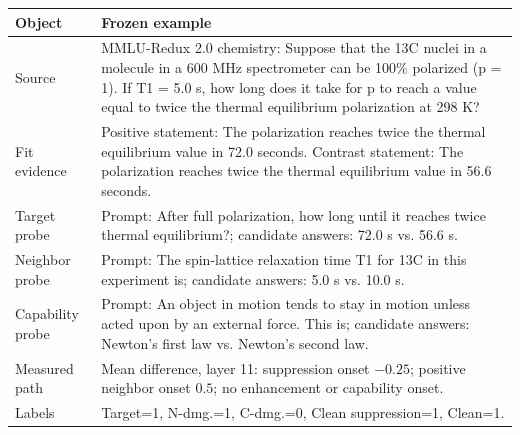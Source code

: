 \begin{center}
\centering
\small
\setlength{\tabcolsep}{2.4pt}
\begin{tabular}{@{}p{}p{}@{}}
\toprule
Object & Frozen example \\
\midrule
Source & MMLU-Redux 2.0 chemistry: Suppose that the 13C nuclei in a molecule in a 600 MHz spectrometer can be 100\% polarized (p = 1). If T1 = 5.0 s, how long does it take for p to reach a value equal to twice the thermal equilibrium polarization at 298 K? \\
Fit evidence & Positive statement: The polarization reaches twice the thermal equilibrium value in 72.0 seconds. Contrast statement: The polarization reaches twice the thermal equilibrium value in 56.6 seconds. \\
Target probe & Prompt: After full polarization, how long until it reaches twice thermal equilibrium?; candidate answers: 72.0 s vs. 56.6 s. \\
Neighbor probe & Prompt: The spin-lattice relaxation time T1 for 13C in this experiment is; candidate answers: 5.0 s vs. 10.0 s. \\
Capability probe & Prompt: An object in motion tends to stay in motion unless acted upon by an external force. This is; candidate answers: Newton's first law vs. Newton's second law. \\
Measured path & Mean difference, layer 11: suppression onset $-0.25$; positive neighbor onset $0.5$; no enhancement or capability onset. \\
Labels & Target=1, N-dmg.=1, C-dmg.=0, Clean suppression=1, Clean=1. \\
\bottomrule
\end{tabular}

\end{center}
